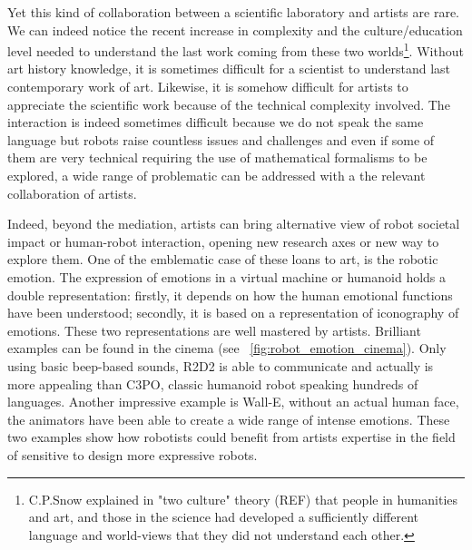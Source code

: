 \begin{figure}[!t]
\centering
    \hfil
    \caption{}
    \label{fig:ergo_robot}
\end{figure}



Yet this kind of collaboration between a scientific laboratory and artists are rare.
We can indeed notice the recent increase in complexity and the culture/education level needed to understand the last work coming from these two worlds\footnote{C.P.Snow explained in "two culture" theory (REF) that people in humanities and art, and those in the science had developed a sufficiently different language and world-views that they did not understand each other.}. Without art history knowledge, it is sometimes difficult for a scientist to understand last contemporary work of art. Likewise, it is somehow difficult for artists to appreciate the scientific work because of the technical complexity involved.
The interaction is indeed sometimes difficult because we do not speak the same language but robots raise countless issues and challenges and even if some of them are very technical requiring the use of mathematical formalisms to be explored, a wide range of problematic can be addressed with a the relevant collaboration of artists.

Indeed, beyond the mediation, artists can bring alternative view of robot societal impact or human-robot interaction, opening new research axes or new way to explore them.
One of the emblematic case of these loans to art, is the robotic emotion. The expression of emotions in a virtual machine or humanoid holds a double representation: firstly, it depends on how the human emotional functions have been understood; secondly, it is based on a representation of iconography of emotions. These two representations are well mastered by artists. Brilliant examples can be found in the cinema (see \figurename~\ref{fig:robot_emotion_cinema}). Only using basic beep-based sounds, R2D2 is able to communicate and actually is more appealing than C3PO, classic humanoid robot speaking hundreds of languages. Another impressive example is Wall-E, without an actual human face, the animators have been able to create a wide range of intense emotions.
These two examples show how robotists could benefit from artists expertise in the field of sensitive to design more expressive robots.


